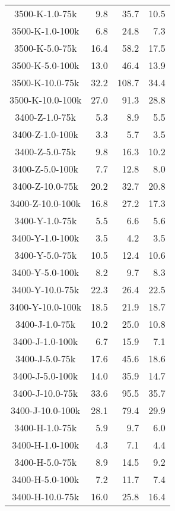 \begin{longtable}{crrr}
    3500-K-1.0-75k   &    9.8 &   35.7 &   10.5 \\
    3500-K-1.0-100k  &    6.8 &   24.8 &    7.3 \\
    3500-K-5.0-75k   &   16.4 &   58.2 &   17.5 \\
    3500-K-5.0-100k  &   13.0 &   46.4 &   13.9 \\
    3500-K-10.0-75k  &   32.2 &  108.7 &   34.4 \\
    3500-K-10.0-100k &   27.0 &   91.3 &   28.8 \\
    3400-Z-1.0-75k   &    5.3 &    8.9 &    5.5 \\
    3400-Z-1.0-100k  &    3.3 &    5.7 &    3.5 \\
    3400-Z-5.0-75k   &    9.8 &   16.3 &   10.2 \\
    3400-Z-5.0-100k  &    7.7 &   12.8 &    8.0 \\
    3400-Z-10.0-75k  &   20.2 &   32.7 &   20.8 \\
    3400-Z-10.0-100k &   16.8 &   27.2 &   17.3 \\
    3400-Y-1.0-75k   &    5.5 &    6.6 &    5.6 \\
    3400-Y-1.0-100k  &    3.5 &    4.2 &    3.5 \\
    3400-Y-5.0-75k   &   10.5 &   12.4 &   10.6 \\
    3400-Y-5.0-100k  &    8.2 &    9.7 &    8.3 \\
    3400-Y-10.0-75k  &   22.3 &   26.4 &   22.5 \\
    3400-Y-10.0-100k &   18.5 &   21.9 &   18.7 \\
    3400-J-1.0-75k   &   10.2 &   25.0 &   10.8 \\
    3400-J-1.0-100k  &    6.7 &   15.9 &    7.1 \\
    3400-J-5.0-75k   &   17.6 &   45.6 &   18.6 \\
    3400-J-5.0-100k  &   14.0 &   35.9 &   14.7 \\
    3400-J-10.0-75k  &   33.6 &   95.5 &   35.7 \\
    3400-J-10.0-100k &   28.1 &   79.4 &   29.9 \\
    3400-H-1.0-75k   &    5.9 &    9.7 &    6.0 \\
    3400-H-1.0-100k  &    4.3 &    7.1 &    4.4 \\
    3400-H-5.0-75k   &    8.9 &   14.5 &    9.2 \\
    3400-H-5.0-100k  &    7.2 &   11.7 &    7.4 \\
    3400-H-10.0-75k  &   16.0 &   25.8 &   16.4 \\

\end{longtable}
